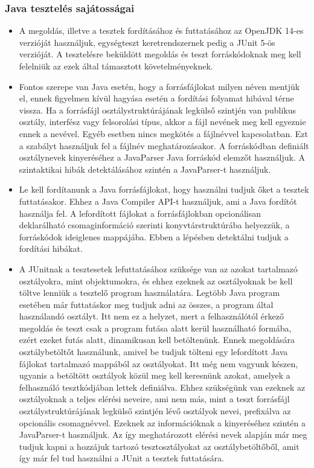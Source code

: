 \documentclass{elteikthesis}
\begin{document}
				\subsubsection{Java tesztelés sajátosságai}
					\begin{itemize}
						\item A megoldás, illetve a tesztek fordításához és futtatásához az OpenJDK 14-es verzióját használjuk, egységteszt keretrendszernek pedig a JUnit 5-ös verzióját. A tesztelésre beküldött megoldás és teszt forráskódoknak meg kell felelniük az ezek által támasztott követelményeknek.
						\item Fontos szerepe van Java esetén, hogy a forrásfájlokat milyen néven mentjük el, ennek figyelmen kívül hagyása esetén a fordítási folyamat hibával térne vissza. Ha a forrásfájl osztálystruktúrájának legkülső szintjén van publikus osztály, interfész vagy felsorolási típus, akkor a fájl nevének meg kell egyeznie ennek a nevével. Egyéb esetben nincs megkötés a fájlnévvel kapcsolatban. Ezt a szabályt használjuk fel a fájlnév meghatározásakor. A forráskódban definiált osztálynevek kinyeréséhez a JavaParser Java forráskód elemzőt használjuk. A szintaktikai hibák detektálásához szintén a JavaParser-t használjuk.
						\item Le kell fordítanunk a Java forrásfájlokat, hogy használni tudjuk őket a tesztek futtatásakor. Ehhez a Java Compiler API-t használjuk, ami a Java fordítót használja fel. A lefordított fájlokat a forrásfájlokban opcionálisan deklarálható csomaginformáció szerinti konyvtárstruktúrába helyezzük, a forráskódok ideiglenes mappájába. Ebben a lépésben detektálni tudjuk a fordítási hibákat.
						\item A JUnitnak a tesztesetek lefuttatásához szüksége van az azokat tartalmazó osztályokra, mint objektumokra, és ehhez ezeknek az osztályoknak be kell töltve lenniük a tesztelő program használatára. Legtöbb Java program esetében már futtatáskor meg tudjuk adni az összes, a program által használandó osztályt. Itt nem ez a helyzet, mert a felhasználótól érkező megoldás és teszt csak a program futása alatt kerül használható formába, ezért ezeket futás alatt, dinamikusan kell betöltenünk. Ennek megoldására osztálybetöltőt használunk, amivel be tudjuk tölteni egy lefordított Java fájlokat tartalmazó mappából az osztályokat. Itt még nem vagyunk készen, ugyanis a betöltött osztályok közül meg kell keresnünk azokat, amelyek a felhasználó tesztkódjában lettek definiálva. Ehhez szükségünk van ezeknek az osztályoknak a teljes elérési neveire, ami nem más, mint a teszt forrásfájl osztálystruktúrájának legkülső szintjén lévő osztályok nevei, prefixálva az opcionális csomagnévvel. Ezeknek az információknak a kinyeréséhez szintén a JavaParser-t használjuk. Az így meghatározott elérési nevek alapján már meg tudjuk kapni a hozzájuk tartozó tesztosztályokat az osztálybetöltőből, amit így már fel tud használni a JUnit a tesztek futtatására.
					\end{itemize}
\end{document}
